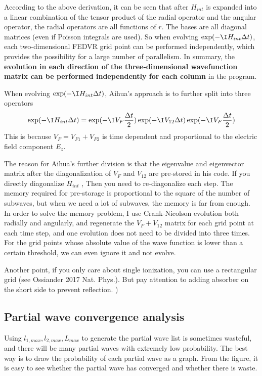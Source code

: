 According to the above derivation, it can be seen that after $H_{int}$ is expanded into a linear combination of the tensor product of the radial operator and the angular operator, the radial operators are all functions of $r$. The bases are all diagonal matrices (even if Poisson integrals are used). So when evolving $\exp(-\I H_{int}\Delta t)$, each two-dimensional FEDVR grid point can be performed independently, which provides the possibility for a large number of parallelism. In summary, the \textbf{evolution in each direction of the three-dimensional wavefunction matrix can be performed independently for each column} in the program.

When evolving $\exp(-\I H_{int}\Delta t)$, Aihua's approach is to further split into three operators
\begin{equation}\label{test3_eq4}
\exp(-\I H_{int}\Delta t) = \exp(-\I V_F\frac{\Delta t}{2}) \exp(-\I V_{12} \Delta t) \exp( -\I V_F\frac{\Delta t}{2})
\end{equation}
This is because $V_F = V_{F1} + V_{F2}$ is time dependent and proportional to the electric field component $E_z$.

The reason for Aihua's further division is that the eigenvalue and eigenvector matrix after the diagonalization of $V_F$ and $V_{12}$ are pre-stored in his code. If you directly diagonalize $H_{int}$ , Then you need to re-diagonalize each step. The memory required for pre-storage is proportional to the square of the number of subwaves, but when we need a lot of subwaves, the memory is far from enough. In order to solve the memory problem, I use Crank-Nicolson evolution both radially and angularly, and regenerate the $V_F + V_{12}$ matrix for each grid point at each time step, and one evolution does not need to be divided into three times. For the grid points whose absolute value of the wave function is lower than a certain threshold, we can even ignore it and not evolve.

Another point, if you only care about single ionization, you can use a rectangular grid (see Ossiander 2017 Nat. Phys.). But pay attention to adding absorber on the short side to prevent reflection. )

\subsection{Partial wave convergence analysis}
Using $l_{1,max} , l_{2,max} , L_{max}$ to generate the partial wave list is sometimes wasteful, and there will be many partial waves with extremely low probability. The best way is to draw the probability of each partial wave as a graph. From the figure, it is easy to see whether the partial wave has converged and whether there is waste.

